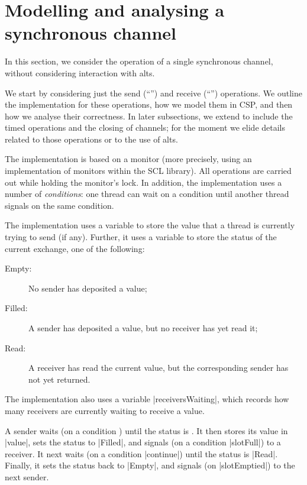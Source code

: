 \section{Modelling and analysing a  synchronous channel}
\label{sec:syncchan}

\inlineScala

In this section, we consider the operation of a single synchronous channel,
without considering interaction with alts.

We start by considering just the send (``\SCALA{!}'') and receive
(``'')  operations.  We outline the implementation for these
operations, how we model them in CSP, and then how we analyse their
correctness.  In later subsections, we extend to include the timed operations
and the closing of channels; for the moment we elide details related to those
operations or to the use of alts.

The implementation is based on a monitor (more precisely, using an
implementation of monitors within the SCL library).  All operations are
carried out while holding the monitor's lock.  In addition, the implementation
uses a number of \emph{conditions}: one thread can wait on a condition until
another thread signals on the same condition.

The implementation uses a variable  to store the value that a
thread is currently trying to send (if any).  Further, it uses a variable
 to store the status of the current exchange, one of the
following: 
\begin{description}
\item[{\scalashape Empty}:] No sender has deposited a value;
\item[{\scalashape Filled}:] A sender has deposited a value, but no receiver
  has yet read it;
\item[{\scalashape Read}:] A receiver has read the current value, but the
  corresponding sender has not yet returned.
\end{description}
%
The implementation also uses a variable |receiversWaiting|, which records how
many receivers are currently waiting to receive a value. 

A sender waits (on a condition ) until the status is
.  It then stores its value in |value|, sets the status to
|Filled|, and signals (on a condition |slotFull|) to a receiver.  It next 
waits (on a condition |continue|) until the status is |Read|.  Finally, it
sets the status back to |Empty|, and signals (on |slotEmptied|) to the next
sender.


